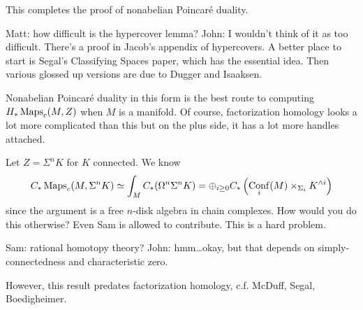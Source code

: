 \documentclass{amsart}
\DeclareMathOperator{\Conf}{Conf}
\begin{document}
This completes the proof of nonabelian Poincar\'e duality.

Matt: how difficult is the hypercover lemma?
John: I wouldn't think of it as too difficult. There's a proof in Jacob's appendix of hypercovers.
A better place to start is Segal's Classifying Spaces paper, which has the essential idea.
Then various glossed up versions are due to Dugger and Isaaksen.


\begin{remark}
    Nonabelian Poincar\'e duality in this form is the best route to computing $H_*\operatorname{Maps}_c(M,Z)$
    when $M$ is a manifold. Of course, factorization homology looks a lot more complicated than
    this but on the plus side, it has a lot more handles attached.
\end{remark}
\begin{example}
    Let $Z=\Sigma^nK$ for $K$ connected. We know
    \begin{align*}
        C_*\Maps_c(M,\Sigma^nK) \simeq \int_M C_*(\Omega^n\Sigma^nK) = \oplus_{i\geq 0}C_*\left( \Conf_i(M)\times_{\Sigma_i}K^{\wedge i} \right)
    \end{align*}
    since the argument is a free $n$-disk algebra in chain complexes.
    How would you do this otherwise? Even Sam is allowed to contribute. This is a hard problem.
    
    Sam: rational homotopy theory?
    John: hmm\ldots okay, but that depends on simply-connectedness and characteristic zero.

    However, this result predates factorization homology, c.f. McDuff, Segal, Boedigheimer.
\end{example}
\end{document}

